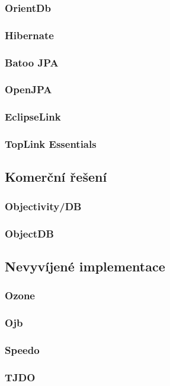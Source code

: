 \subsubsection{OrientDb}
\subsubsection{Hibernate}
\subsubsection{Batoo JPA}
\subsubsection{OpenJPA}
\subsubsection{EclipseLink}
\subsubsection{TopLink Essentials}
\subsection{Komerční řešení}
\subsubsection{Objectivity/DB}
\subsubsection{ObjectDB}
\subsection{Nevyvíjené implementace}
\subsubsection{Ozone}
\subsubsection{Ojb}
\subsubsection{Speedo}
\subsubsection{TJDO}

